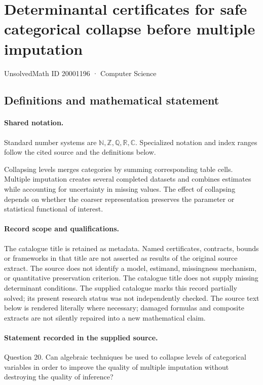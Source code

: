 \documentclass[11pt]{article}
\begin{document}
\setcounter{section}{20001195}
\section{Determinantal certificates for safe categorical collapse before multiple imputation}\label{20001196}
{\small\sffamily UnsolvedMath ID 20001196 · Computer Science}
\subsection{Definitions and mathematical statement}

\paragraph{Shared notation.}Standard number systems are $\mathbb N,\mathbb Z,\mathbb Q,\mathbb R,\mathbb C$. Specialized notation and index ranges follow the cited source and the definitions below.


Collapsing levels merges categories by summing corresponding table cells. Multiple imputation creates several completed datasets and combines estimates while accounting for uncertainty in missing values. The effect of collapsing depends on whether the coarser representation preserves the parameter or statistical functional of interest.
\paragraph{Record scope and qualifications.}
The catalogue title is retained as metadata. Named certificates, contracts, bounds or frameworks in that title are not asserted as results of the original source extract.
The source does not identify a model, estimand, missingness mechanism, or quantitative preservation criterion. The catalogue title does not supply missing determinant conditions. The supplied catalogue marks this record partially solved; its present research status was not independently checked.
The source text below is rendered literally where necessary; damaged formulas and composite extracts are not silently repaired into a new mathematical claim.
\paragraph{Statement recorded in the supplied source.}
Question 20. Can algebraic techniques be used to collapse levels of categorical variables in order to improve the quality of multiple imputation without destroying the quality of inference?
\end{document}
